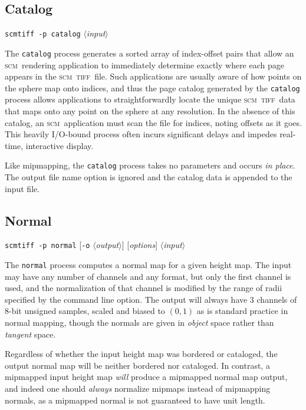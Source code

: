 \documentclass[oneside,10pt]{memoir}
\newcommand{\scm}     {\textsc{scm}}
\newcommand{\tiff}    {\textsc{tiff}}
\newcommand{\scmtiff} {\texttt{scmtiff}}
\newcommand{\inangles}[1]{$\langle$#1$\rangle$}
\begin{document}
\begin{Spacing}{1.1}
\subsection{Catalog}

\noindent\scmtiff\ \texttt{-p catalog} \inangles{\textit{input}}

\bigskip The \texttt{catalog} process generates a sorted array of index-offset pairs that allow an \scm\ rendering application to immediately determine exactly where each page appears in the \scm\ \tiff\ file. Such applications are usually aware of how points on the sphere map onto indices, and thus the page catalog generated by the \texttt{catalog} process allows applications to straightforwardly locate the unique \scm\ \tiff\ data that maps onto any point on the sphere at any resolution. In the absence of this catalog, an \scm\ application must scan the file for indices, noting offsets as it goes. This heavily I/O-bound process often incurs significant delays and impedes real-time, interactive display.

Like mipmapping, the \texttt{catalog} process takes no parameters and occurs \emph{in place}. The output file name option is ignored and the catalog data is appended to the input file.

\subsection{Normal}

\noindent\scmtiff\ \texttt{-p normal} [\texttt{-o} \inangles{\textit{output}}] [\textit{options}] \inangles{\textit{input}}

\bigskip The \texttt{normal} process computes a normal map for a given height map. The input may have any number of channels and any format, but only the first channel is used, and the normalization of that channel is modified by the range of radii specified by the command line option. The output will always have 3 channels of 8-bit unsigned samples, scaled and biased to $(0,1)$ as is standard practice in normal mapping, though the normals are given in \emph{object} space rather than \emph{tangent} space.

Regardless of whether the input height map was bordered or cataloged, the output normal map will be neither bordered nor cataloged. In contrast, a mipmapped input height map \emph{will} produce a mipmapped normal map output, and indeed one should \emph{always} normalize mipmaps instead of mipmapping normals, as a mipmapped normal is not guaranteed to have unit length.


\end{Spacing}
\end{document}
